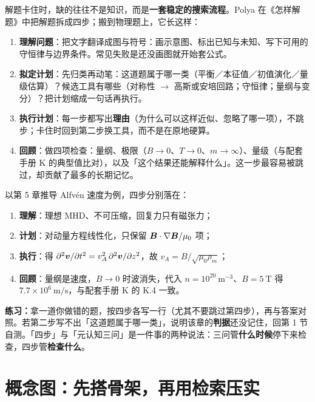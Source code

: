 解题卡住时，缺的往往不是知识，而是\textbf{一套稳定的搜索流程}。Polya 在《怎样解题》中把解题拆成四步；搬到物理题上，它长这样：

\begin{enumerate}
\item \textbf{理解问题}：把文字翻译成图与符号：画示意图、标出已知与未知、写下可用的守恒律与边界条件。常见失败是还没画图就开始套公式。
\item \textbf{拟定计划}：先归类再动笔：这道题属于哪一类（平衡／本征值／初值演化／量级估算）？候选工具有哪些（对称性 $\to$ 高斯或安培回路；守恒律；量纲与变分）？把计划缩成一句话再执行。
\item \textbf{执行计划}：每一步都写出\textbf{理由}（为什么可以这样近似、忽略了哪一项），不跳步；卡住时回到第二步换工具，而不是在原地硬算。
\item \textbf{回顾}：做四项检查：量纲、极限（$B\to0$、$T\to0$、$m\to\infty$）、量级（与配套手册 K 的典型值比对），以及「这个结果还能解释什么」。这一步最容易被跳过，却贡献了最多的长期记忆。
\end{enumerate}

以第 5 章推导 Alfvén 速度为例，四步分别落在：

\begin{enumerate}
\item \textbf{理解}：理想 MHD、不可压缩，回复力只有磁张力；
\item \textbf{计划}：对动量方程线性化，只保留 $\bm{B}\cdot\nabla\bm{B}/\mu_0$ 项；
\item \textbf{执行}：得 $\partial^2\bm{v}/\partial t^2=v_A^2\,\partial^2\bm{v}/\partial z^2$，故 $v_A=B/\sqrt{\mu_0\rho_m}$；
\item \textbf{回顾}：量纲是速度，$B\to0$ 时波消失，代入 $n=10^{20}\ \mathrm{m^{-3}}$、$B=5\ \mathrm{T}$ 得 $7.7\times10^{6}\ \mathrm{m/s}$，与配套手册 K 的 K.4 一致。
\end{enumerate}

\begin{miniquiz}
\textbf{练习：}拿一道你做错的题，按四步各写一行（尤其不要跳过第四步），再与答案对照。若第二步写不出「这道题属于哪一类」，说明该章的\textbf{判据}还没记住，回第 1 节自测。「四步」与「元认知三问」是一件事的两种说法：三问管\textbf{什么时候}停下来检查，四步管\textbf{检查什么}。
\end{miniquiz}


\section{概念图：先搭骨架，再用检索压实}


